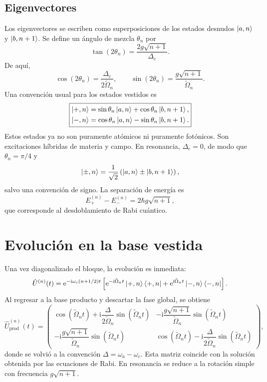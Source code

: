 \documentclass[11pt]{article}
\newcommand{\ii}{\mathrm{i}}
\newcommand{\ee}{\mathrm{e}}
\newcommand{\Omn}{\tilde\Omega_n}
\begin{document}
\subsection{Eigenvectores}

Los eigenvectores se escriben como superposiciones de los estados desnudos
$\ket{a,n}$ y $\ket{b,n+1}$. Se define un \'angulo de mezcla $\theta_n$ por
\begin{equation}
  \tan(2\theta_n)
  =
  \frac{2g\sqrt{n+1}}{\Delta_c}.
\end{equation}
De aqu\'i,
\begin{equation}
  \cos(2\theta_n)=\frac{\Delta_c}{2\Omn},
  \qquad
  \sin(2\theta_n)=\frac{g\sqrt{n+1}}{\Omn}.
\end{equation}
Una convenci\'on usual para los estados vestidos es
\begin{equation}
  \boxed{
  \begin{aligned}
    \ket{+,n}
    &=
    \sin\theta_n\ket{a,n}
    +
    \cos\theta_n\ket{b,n+1},
    \\
    \ket{-,n}
    &=
    \cos\theta_n\ket{a,n}
    -
    \sin\theta_n\ket{b,n+1}.
  \end{aligned}
  }
\end{equation}
Estos estados ya no son puramente at\'omicos ni puramente fot\'onicos. Son
excitaciones h\'ibridas de materia y campo. En resonancia,
$\Delta_c=0$, de modo que $\theta_n=\pi/4$ y
\begin{equation}
  \ket{\pm,n}
  =
  \frac{1}{\sqrt2}
  \left(\ket{a,n}\pm\ket{b,n+1}\right),
\end{equation}
salvo una convenci\'on de signo. La separaci\'on de energ\'ia es
\begin{equation}
  E_+^{(n)}-E_-^{(n)}
  =
  2\hbar g\sqrt{n+1},
\end{equation}
que corresponde al desdoblamiento de Rabi cu\'antico.

\section{Evoluci\'on en la base vestida}

Una vez diagonalizado el bloque, la evoluci\'on es inmediata:
\begin{equation}
  \hat U^{(n)}(t)
  =
  \ee^{-\ii\omega_c(n+1/2)t}
  \left[
  \ee^{-\ii\Omn t}\ket{+,n}\bra{+,n}
  +
  \ee^{\ii\Omn t}\ket{-,n}\bra{-,n}
  \right].
\end{equation}
Al regresar a la base producto y descartar la fase global, se obtiene
\begin{equation}
  \hat U_{\mathrm{prod}}^{(n)}(t)
  =
  \begin{pmatrix}
    \cos(\Omn t)+\ii\dfrac{\Delta}{2\Omn}\sin(\Omn t) &
    -\ii\dfrac{g\sqrt{n+1}}{\Omn}\sin(\Omn t)\\[10pt]
    -\ii\dfrac{g\sqrt{n+1}}{\Omn}\sin(\Omn t) &
    \cos(\Omn t)-\ii\dfrac{\Delta}{2\Omn}\sin(\Omn t)
  \end{pmatrix},
\end{equation}
donde se volvi\'o a la convenci\'on $\Delta=\omega_a-\omega_c$. Esta matriz
coincide con la soluci\'on obtenida por las ecuaciones de Rabi. En resonancia
se reduce a la rotaci\'on simple con frecuencia $g\sqrt{n+1}$.
\end{document}
